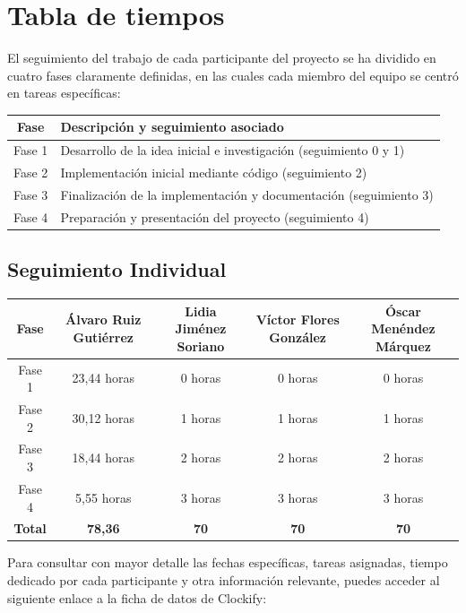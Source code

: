 \documentclass[a4paper]{article}
\begin{document}
  \newpage

\section{Tabla de tiempos}

El seguimiento del trabajo de cada participante del proyecto se ha dividido en cuatro fases claramente definidas, en las cuales cada miembro del equipo se centró en tareas específicas:
\begin{center}
  \begin{tabular}{|c|l|}
  \hline
  \textbf{Fase} & \textbf{Descripción y seguimiento asociado} \\
  \hline
  Fase 1 & Desarrollo de la idea inicial e investigación (seguimiento 0 y 1) \\
  Fase 2 & Implementación inicial mediante código (seguimiento 2) \\
  Fase 3 & Finalización de la implementación y documentación (seguimiento 3) \\
  Fase 4 & Preparación y presentación del proyecto (seguimiento 4) \\
  \hline
  \end{tabular}
  \end{center}

  \subsection*{Seguimiento Individual}

  \begin{center}
  \begin{tabular}{|c|c|c|c|c|}
  \hline
  Fase & Álvaro Ruiz Gutiérrez & Lidia Jiménez Soriano & Víctor Flores González & Óscar Menéndez Márquez \\
  \hline
  Fase 1 & 23,44 horas & 0 horas& 0 horas& 0 horas\\
  Fase 2 & 30,12 horas & 1 horas& 1 horas& 1 horas\\
  Fase 3 & 18,44 horas& 2 horas & 2 horas& 2 horas\\
  Fase 4 & 5,55 horas& 3 horas & 3 horas& 3 horas\\
  \hline
  \textbf{Total} & \textbf{78,36} & \textbf{70} & \textbf{70} & \textbf{70} \\
  \hline
  \end{tabular}
  \end{center}
  

Para consultar con mayor detalle las fechas específicas, tareas asignadas, tiempo dedicado por cada participante 
y otra información relevante, puedes acceder al siguiente enlace a la ficha de datos de Clockify: 
\end{document}
